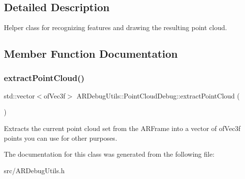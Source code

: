 \subsection{Detailed Description}
Helper class for recognizing features and drawing the resulting point cloud. 

\subsection{Member Function Documentation}
\mbox{\label{class_a_r_debug_utils_1_1_point_cloud_debug_ad68fcfdaab9a19a25f37710e0dbcd477}} 
\subsubsection{\texorpdfstring{extract\+Point\+Cloud()}{extractPointCloud()}}
{\footnotesize\ttfamily std\+::vector$<$of\+Vec3f$>$ A\+R\+Debug\+Utils\+::\+Point\+Cloud\+Debug\+::extract\+Point\+Cloud (\begin{DoxyParamCaption}{ }\end{DoxyParamCaption})\hspace{0.3cm}{\ttfamily [inline]}}

Extracts the current point cloud set from the A\+R\+Frame into a vector of of\+Vec3f points you can use for other purposes. 

The documentation for this class was generated from the following file\+:\begin{DoxyCompactItemize}
\item 
src/A\+R\+Debug\+Utils.\+h\end{DoxyCompactItemize}
